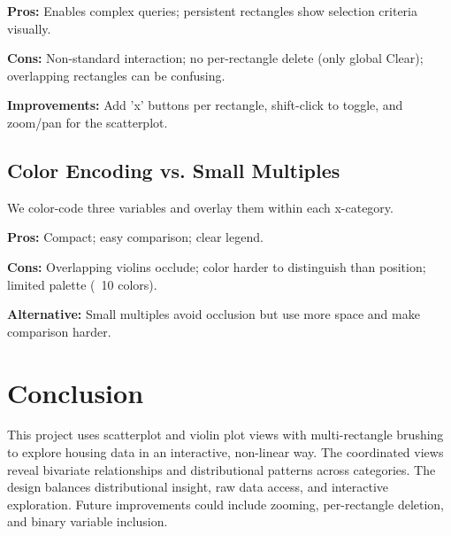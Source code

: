 \documentclass[sigplan,screen]{acmart}
\begin{document}
\textbf{Pros:} Enables complex queries; persistent rectangles show
selection criteria visually.

\textbf{Cons:} Non-standard interaction; no per-rectangle delete (only
global Clear); overlapping rectangles can be confusing.

\textbf{Improvements:} Add 'x' buttons per rectangle, shift-click to
toggle, and zoom/pan for the scatterplot.

\subsection{Color Encoding vs. Small Multiples}

We color-code three variables and overlay them within each x-category.

\textbf{Pros:} Compact; easy comparison; clear legend.

\textbf{Cons:} Overlapping violins occlude; color harder to distinguish
than position; limited palette (~10 colors).

\textbf{Alternative:} Small multiples avoid occlusion but use more space
and make comparison harder.

\section{Conclusion}

This project uses scatterplot and violin plot views with
multi-rectangle brushing to explore housing data in an interactive, non-linear way.
The coordinated views reveal bivariate relationships and distributional patterns across
categories.
The design balances distributional insight, raw data access, and
interactive exploration. Future improvements could include zooming,
per-rectangle deletion, and binary variable inclusion.


\end{document}
